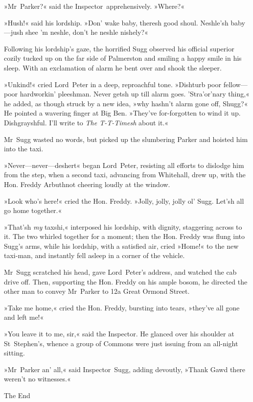 »Mr~Parker?« said the Inspector~apprehensively. »Where?«

»Hush!« said his lordship. »Don' wake baby, theresh good shoul.  Neshle'sh baby—jush shee 'm neshle, don't he neshle nishely?«

Following his lordship's gaze, the horrified Sugg observed his official superior cozily tucked up on the far side of Palmerston and smiling a happy smile in his sleep. With an exclamation of alarm he bent over and shook the sleeper.

»Unkind!« cried Lord~Peter in a deep, reproachful tone. »Dishturb poor fellow—poor hardworkin' pleeshman. Never getsh up till alarm goes\textellipsis .  'Stra'or'nary thing,« he added, as though struck by a new idea, »why hashn't alarm gone off, Shugg?« He pointed a wavering finger at Big Ben. »They've for-forgotten to wind it up. Dishgrayshful. I'll write to \textit{The T-T-Timesh} about it.«

Mr~Sugg wasted no words, but picked up the slumbering Parker and hoisted him into the taxi.

»Never—never—deshert\longdash« began Lord~Peter, resisting all efforts to dislodge him from the step, when a second taxi, advancing from Whitehall, drew up, with the Hon. Freddy Arbuthnot cheering loudly at the window.

»Look who's here!« cried the Hon. Freddy. »Jolly, jolly, jolly ol' Sugg. Let'sh all go home together.«

»That'sh \textit{my} taxshi,« interposed his lordship, with dignity, staggering across to it. The two whirled together for a moment; then the Hon. Freddy was flung into Sugg's arms, while his lordship, with a satisfied air, cried »Home!« to the new taxi-man, and instantly fell asleep in a corner of the vehicle.

Mr~Sugg scratched his head, gave Lord~Peter's address, and watched the cab drive off. Then, supporting the Hon. Freddy on his ample bosom, he directed the other man to convey Mr~Parker to 12a Great Ormond Street.

»Take me home,« cried the Hon. Freddy, bursting into tears, »they've all gone and left me!«

»You leave it to me, sir,« said the Inspector. He glanced over his shoulder at St~Stephen's, whence a group of Commons were just issuing from an all-night sitting.

»Mr~Parker an' all,« said Inspector~Sugg, adding devoutly, »Thank Gawd there weren't no witnesses.«
\vfill

\begin{center}\mytitlefont\Huge
	The End
\end{center}